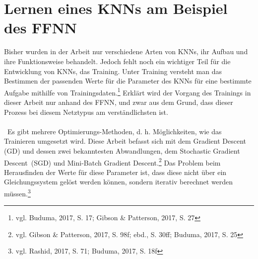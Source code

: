 \documentclass[a4paper,12pt,ngerman,oneside]{scrreprt}	%
\begin{document}
	\chapter{Lernen eines KNNs am Beispiel des FFNN}\label{Lernen}
	Bisher wurden in der Arbeit nur verschiedene Arten von KNNs, ihr Aufbau und ihre Funktionsweise behandelt. Jedoch fehlt noch ein wichtiger Teil für die Entwicklung von KNNs, das Training. Unter Training versteht man das Bestimmen der passenden Werte für die Parameter des KNNs für eine bestimmte Aufgabe mithilfe von Trainingsdaten.\footnote{vgl. Buduma, 2017, S. 17; Gibson \& Patterson, 2017, S. 27} Erklärt wird der Vorgang des Trainings in dieser Arbeit nur anhand des FFNN, und zwar aus dem Grund, dass dieser Prozess bei diesem Netztypus am verständlichsten ist.
	\\ \
	\\ \
	Es gibt mehrere Optimierungs-Methoden, d. h. Möglichkeiten, wie das Trainieren umgesetzt wird. Diese Arbeit befasst sich mit dem Gradient Descent (GD) und dessen zwei bekanntesten Abwandlungen, dem Stochastic Gradient \mbox{Descent (SGD)} und Mini-Batch Gradient Descent.\footnote{vgl. Gibson \& Patterson, 2017, S. 98f; ebd., S. 30ff; Buduma, 2017, S. 25} Das Problem beim Herausfinden der Werte für diese Parameter ist, dass diese nicht über ein Gleichungssystem gelöst werden können, sondern iterativ berechnet werden müssen.\footnote{vgl. Rashid, 2017, S. 71; Buduma, 2017, S. 18f}
	
\end{document}
